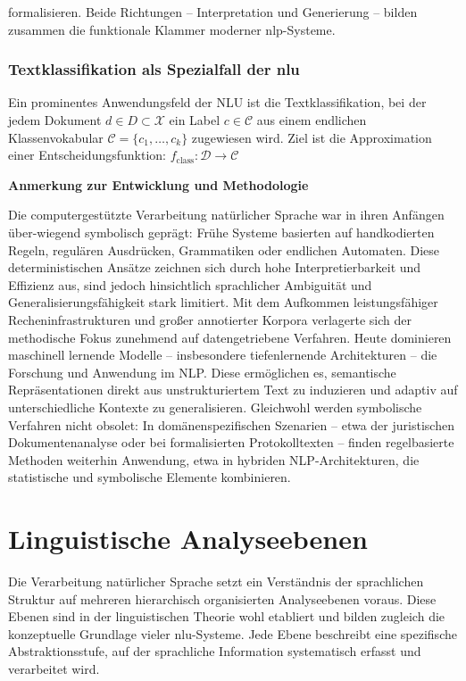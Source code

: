 formalisieren. Beide Richtungen – Interpretation und Generierung – bilden zusammen die funktionale Klammer moderner \ac{nlp}-Systeme.

\subsubsection{Textklassifikation als Spezialfall der \ac{nlu}}

Ein prominentes Anwendungsfeld der NLU ist die Textklassifikation, bei der jedem Dokument \(d \in D \subset \mathcal{X} \)  ein Label \(c \in \mathcal{C} \) aus einem endlichen Klassenvokabular \( \mathcal{C} = \{c_1, \dots, c_k\} \)  zugewiesen wird. Ziel ist die Approximation einer Entscheidungsfunktion: \( f_{\text{class}}: \mathcal{D} \rightarrow \mathcal{C}\)


\textbf{Anmerkung zur Entwicklung und Methodologie}

Die computergestützte Verarbeitung natürlicher Sprache war in ihren Anfängen über-wiegend symbolisch geprägt: Frühe Systeme basierten auf handkodierten Regeln, regulären Ausdrücken, Grammatiken oder endlichen Automaten. Diese deterministischen Ansätze zeichnen sich durch hohe Interpretierbarkeit und Effizienz aus, sind jedoch hinsichtlich sprachlicher Ambiguität und Generalisierungsfähigkeit stark limitiert. Mit dem Aufkommen leistungsfähiger Recheninfrastrukturen und großer annotierter Korpora verlagerte sich der methodische Fokus zunehmend auf datengetriebene Verfahren. Heute dominieren maschinell lernende Modelle – insbesondere tiefenlernende Architekturen – die Forschung und Anwendung im NLP. Diese ermöglichen es, semantische Repräsentationen direkt aus unstrukturiertem Text zu induzieren und adaptiv auf unterschiedliche Kontexte zu generalisieren. Gleichwohl werden symbolische Verfahren nicht obsolet: In domänenspezifischen Szenarien – etwa der juristischen Dokumentenanalyse oder bei formalisierten Protokolltexten – finden regelbasierte Methoden weiterhin Anwendung, etwa in hybriden NLP-Architekturen, die statistische und symbolische Elemente kombinieren.


\section{Linguistische Analyseebenen}

Die Verarbeitung natürlicher Sprache setzt ein Verständnis der sprachlichen Struktur auf mehreren hierarchisch organisierten Analyseebenen voraus. Diese Ebenen sind in der linguistischen Theorie wohl etabliert und bilden zugleich die konzeptuelle Grundlage vieler \ac{nlu}-Systeme. Jede Ebene beschreibt eine spezifische Abstraktionsstufe, auf der sprachliche Information systematisch erfasst und verarbeitet wird.

